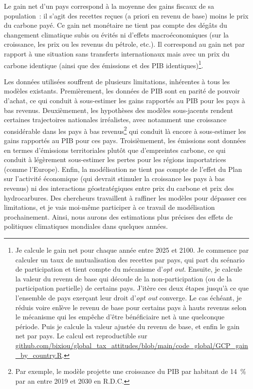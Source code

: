\documentclass[a5paper,french,openany]{memoir}
\begin{document}
Le gain net d'un pays correspond à la moyenne des gains fiscaux de sa population~: il s'agit des recettes reçues (a priori en revenu de base) moins le prix du carbone payé. Ce gain net monétaire ne tient pas compte des dégâts du changement climatique subis ou évités ni d'effets macroéconomiques (sur la croissance, les prix ou les revenus du pétrole, etc.). Il correspond au gain net par rapport à une situation sans transferts internationaux mais avec un prix du carbone identique (ainsi que des émissions et des PIB identiques)\footnote{Je calcule le gain net pour chaque année entre 2025 et 2100. 
Je commence par calculer un taux de mutualisation des recettes par pays, qui part du scénario de participation et tient compte du mécanisme d'\textit{opt out}. Ensuite, je calcule la valeur du revenu de base qui découle de la non-participation (ou de la participation partielle) de certains pays. J'itère ces deux étapes jusqu'à ce que l'ensemble de pays exerçant leur droit d'\textit{opt out} converge. 
Le cas échéant, je réduis voire enlève le revenu de base pour certains pays à hauts revenus selon le mécanisme qui les empêche d'être bénéficiaire net à une quelconque période. Puis je calcule la valeur ajustée du revenu de base, et enfin le gain net par pays. Le calcul est reproductible sur \href{https://github.com/bixiou/global_tax_attitudes/blob/main/code_global/GCP_gain_by_country.R}{github.com/bixiou/global\_tax\_attitudes/blob/main/code\_global/GCP\_gain\_by\_country.R}.}. 

Les données utilisées souffrent de plusieurs limitations, inhérentes à tous les modèles existants. Premièrement, les données de PIB sont en parité de pouvoir d'achat, ce qui conduit à sous-estimer les gains rapportés au PIB pour les pays à bas revenus. Deuxièmement, les hypothèses des modèles sous-jacents rendent certaines trajectoires nationales irréalistes, avec notamment une croissance considérable dans les pays à bas revenus\footnote{Par exemple, le modèle projette une croissance du PIB par habitant de 14~\% par an entre 2019 et 2030 en R.D.C.} qui conduit là encore à sous-estimer les gains rapportés au PIB pour ces pays. Troisièmement, les émissions sont données en termes d'émissions territoriales plutôt que d'empreintes carbone, ce qui conduit à légèrement %
sous-estimer les pertes pour les régions importatrices (comme l'Europe). Enfin, la modélisation ne tient pas compte de l'effet du Plan sur l'activité économique (qui devrait stimuler la croissance les pays à bas revenus) ni des interactions géostratégiques entre prix du carbone et prix des hydrocarbures. Des chercheurs travaillent à raffiner les modèles pour dépasser ces limitations, et je vais moi-même participer à ce travail de modélisation prochainement. Ainsi, nous aurons des estimations plus précises des effets de politiques climatiques mondiales dans quelques années. %
\end{document}

